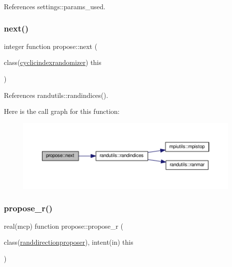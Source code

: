 References settings\+::params\+\_\+used.

\mbox{\label{namespacepropose_a57ab2c55501784356748335378f0ca91}} 
\subsubsection{\texorpdfstring{next()}{next()}}
{\footnotesize\ttfamily integer function propose\+::next (\begin{DoxyParamCaption}\item[{class(\mbox{\hyperlink{structpropose_1_1cyclicindexrandomizer}{cyclicindexrandomizer}})}]{this }\end{DoxyParamCaption})}



References randutils\+::randindices().

Here is the call graph for this function\+:
\nopagebreak
\begin{figure}[H]
\begin{center}
\leavevmode
\includegraphics[width=350pt]{namespacepropose_a57ab2c55501784356748335378f0ca91_cgraph}
\end{center}
\end{figure}
\mbox{\label{namespacepropose_a5181089142665b7ba3e73b0e8517744c}} 
\subsubsection{\texorpdfstring{propose\+\_\+r()}{propose\_r()}}
{\footnotesize\ttfamily real(mcp) function propose\+::propose\+\_\+r (\begin{DoxyParamCaption}\item[{class(\mbox{\hyperlink{structpropose_1_1randdirectionproposer}{randdirectionproposer}}), intent(in)}]{this }\end{DoxyParamCaption})}



